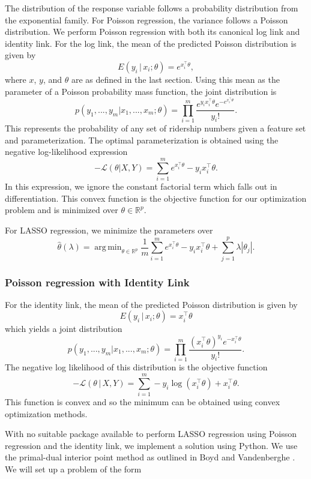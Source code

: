 \documentclass[11pt]{article}
\DeclareMathOperator*{\argmin}{arg\,min}
\begin{document}
The distribution of the response variable follows a probability distribution from the exponential family. For Poisson regression, the variance follows a Poisson distribution. We perform Poisson regression with both its canonical log link and identity link. For the log link, the mean of the predicted Poisson distribution is given by 
\[E(y_i\,|\,x_i;\theta) = e^{x_i^\top\theta},\]
where $x$, $y$, and $\theta$ are as defined in the last section. 
Using this mean as the parameter of a Poisson probability mass function, the joint distribution is
\[p(y_1, ..., y_m|x_1, ..., x_m; \theta) = \prod_{i=1}^m \frac{e^{y_ix_i^{\top} \theta}e^{-e^{x_i^{\top}\theta}}}{y_i!}.\]
This represents the probability of any set of ridership numbers given a feature set and parameterization. The optimal parameterization is obtained using the negative log-likelihood expression
\[-\mathcal{L}(\theta|X, Y) = \sum_{i=1}^m e^{x_i^\top\theta}-y_ix_i^\top\theta. \]
In this expression, we ignore the constant factorial term which falls out in differentiation. This convex function is the objective function for our optimization problem and is minimized over $\theta\in\mathbb{R}^p$.

For LASSO regression, we minimize the parameters \cite{Young2007} over  
\[\hat{\theta}(\lambda) = \argmin_{\theta\in\mathbb{R}^p}  \frac{1}{m}\sum_{i=1}^m e^{x_i^\top\theta}-y_ix_i^\top\theta  + \sum_{j=1}^p\lambda\left|\theta_j\right|.\]

\subsubsection{Poisson regression with Identity Link}

For the identity link, the mean of the predicted Poisson distribution is given by $$E(y_i\,|\,x_i;\theta) = x_i^\top\theta$$ which yields a joint distribution 
$$p(y_1,...,y_m|x_1,...,x_m;\theta) = \prod_{i=1}^m \frac{\left(x_i^\top\theta\right)^{y_i}e^{-x_i^\top\theta}}{y_i!}. $$
The negative log likelihood of this distribution is the objective function
\begin{equation}-\mathcal{L}\left(\theta\,|\,X, Y\right) = \sum_{i=1}^m -y_i\log{\left(x_i^\top\theta\right)} +x_i^\top\theta. \label{eq:piloglik}\end{equation} This function is convex and so the minimum can be obtained using convex optimization methods. 

With no suitable package available to perform LASSO regression using Poisson regression and the identity link, we implement a solution using Python. We use the primal-dual interior point method as outlined in Boyd and Vandenberghe \cite{Boyd2004}. We will set up a problem of the form 
\end{document}
